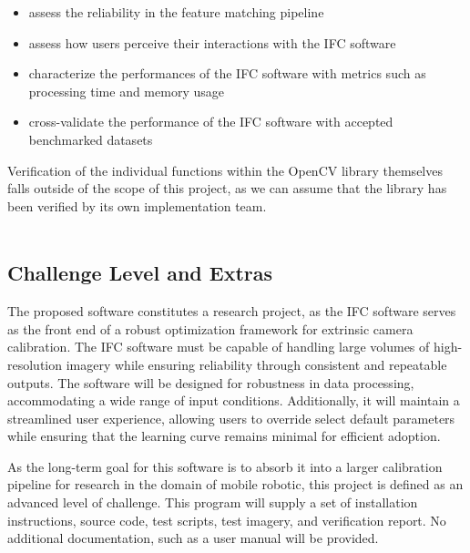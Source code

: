 \documentclass[12pt, titlepage]{article}
\begin{document}
\begin{itemize}
  \item assess the reliability in the feature matching pipeline
  \item assess how users perceive their interactions with the IFC software 
  \item characterize the performances of the IFC software with metrics such as processing time and 
  memory usage
  \item cross-validate the performance of the IFC software with accepted benchmarked datasets
\end{itemize}
Verification of the individual functions within the OpenCV library themselves falls outside of the 
scope of this project, as we can assume that the library has been verified by its own 
implementation team. 
\\ \\

\subsection{Challenge Level and Extras}
The proposed software constitutes a research project, as the IFC software serves as the front end of a robust optimization framework 
for extrinsic camera calibration. The IFC software must be capable of handling large volumes of high-resolution imagery while ensuring reliability through consistent and repeatable outputs. The software will be designed for robustness in data processing, accommodating a wide range of input conditions. Additionally, it will maintain a streamlined user experience, allowing users to override select default parameters while ensuring that the learning curve remains minimal for efficient adoption. 

As the long-term goal for this software is to absorb it into a larger calibration pipeline for research in the domain of mobile robotic, this project is defined as an advanced level of challenge. This program will supply a set of installation instructions, source code, test scripts, test imagery, and verification report. No additional documentation, such as a user manual will be provided.
\end{document}
